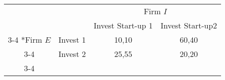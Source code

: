  \begin{table}[h]
	\centering
	\resizebox{9.5cm}{!} 
	{ 
		\renewcommand{\arraystretch}{1.7}
		\setlength{\extrarowheight}{1pt}
		\begin{tabular}{cc|c|c|}
			& \multicolumn{1}{c}{}  & \multicolumn{2}{c}{Firm $I$} \\
			& \multicolumn{1}{c}{} & \multicolumn{1}{c}{Invest Start-up 1} & \multicolumn{1}{c}{Invest Start-up2} \\\cline{3-4}
			\multirow{2}*{Firm $E$}  & Invest 1 & 10,10 & 60,40 \\\cline{3-4}
			& Invest 2 & 25,55 & 20,20 \\\cline{3-4}
	\end{tabular}}
\end{table}
